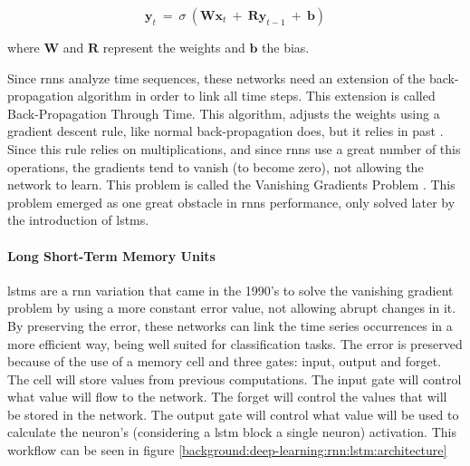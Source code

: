 \documentclass[
  twoside,
  11pt, a4paper,
  footinclude=true,
  headinclude=true,
  cleardoublepage=empty
]{scrbook}
\begin{document}
        \begin{equation}
            \boldsymbol{y}_t\ =\ \sigma\ (\boldsymbol{Wx}_t\ +\ \boldsymbol{Ry}_{t-1}\ +\ \boldsymbol{b})
        \end{equation}

        where $\boldsymbol{W}$ and $\boldsymbol{R}$ represent the weights and $\boldsymbol{b}$ the bias.

        Since \glspl{rnn} analyze time sequences, these networks need an extension of the back-propagation algorithm in order to link all time steps. This extension is called Back-Propagation Through Time. This algorithm, adjusts the weights using a gradient descent rule, like normal back-propagation does, but it relies in past . Since this rule relies on multiplications, and since \glspl{rnn} use a great number of this operations, the gradients tend to vanish (to become zero), not allowing the network to learn. This problem is called the Vanishing Gradients Problem \cite{hochreiter1998vanishing}. This problem emerged as one great obstacle in \glspl{rnn} performance, only solved later by the introduction of \glspl{lstm}.

        \paragraph{Long Short-Term Memory Units}
          \glspl{lstm} are a \gls{rnn} variation that came in the 1990's \cite{hochreiter1997long} to solve the vanishing gradient problem by using a more constant error value, not allowing abrupt changes in it. By preserving the error, these networks can link the time series occurrences in a more efficient way, being well suited for classification tasks. The error is preserved because of the use of a memory cell and three gates: input, output and forget. The cell will store values from previous computations. The input gate will control what value will flow to the network. The forget will control the values that will be stored in the network. The output gate will control what value will be used to calculate the neuron's (considering a \gls{lstm} block a single neuron) activation. This workflow can be seen in figure \ref{background:deep-learning:rnn:lstm:architecture}
\end{document}

